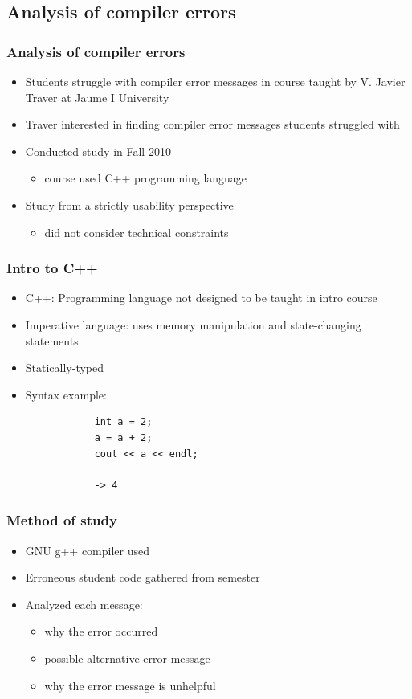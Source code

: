 \documentclass{beamer}
\begin{document}
\subsection[Compiler Analysis]{Analysis of compiler errors}

\begin{frame}
	\frametitle{Analysis of compiler errors}
		\begin{itemize}
			\item Students struggle with compiler error messages in course taught by V. Javier Traver at Jaume I University
			\item Traver interested in finding compiler error messages students struggled with
			\item Conducted study in Fall 2010
				\begin{itemize}
				\item course used C++ programming language
				\end{itemize}
			\item Study from a strictly usability perspective
			\begin{itemize}
				\item did not consider technical constraints
			\end{itemize}
		\end{itemize}

\end{frame}

\begin{frame}[fragile]
	\frametitle{Intro to C++}
		\begin{itemize}
			\item C++: Programming language not designed to be taught in intro course
			\item Imperative language: uses memory manipulation and state-changing statements
			\item Statically-typed
			\item Syntax example:
			\begin{verbatim}
			int a = 2;
			a = a + 2;
			cout << a << endl;
			
			-> 4
			\end{verbatim}
		\end{itemize}

\end{frame}

\begin{frame}
	\frametitle{Method of study}
		\begin{itemize}
			\item GNU g++ compiler used
			\item Erroneous student code gathered from semester
			\item Analyzed each message:
			\begin{itemize}
				\item why the error occurred
				\item possible alternative error message
				\item why the error message is unhelpful
			\end{itemize}
		\end{itemize}

\end{frame}
\end{document}
